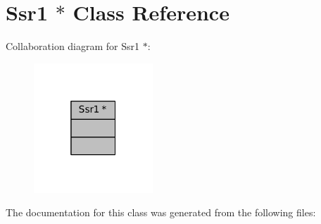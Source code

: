 \hypertarget{classSsr1_01_5}{}\section{Ssr1 $\ast$ Class Reference}
\label{classSsr1_01_5}


Collaboration diagram for Ssr1 $\ast$\+:
\nopagebreak
\begin{figure}[H]
\begin{center}
\leavevmode
\includegraphics[width=127pt]{classSsr1_01_5__coll__graph}
\end{center}
\end{figure}


The documentation for this class was generated from the following files\+: